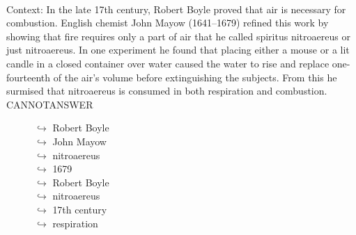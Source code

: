 \documentclass[11pt,a4paper, onecolumn]{article}
\begin{document}
\\ Context: In the late 17th century, Robert Boyle proved that air is necessary for combustion. English chemist John Mayow (1641–1679) refined this work by showing that fire requires only a part of air that he called spiritus nitroaereus or just nitroaereus. In one experiment he found that placing either a mouse or a lit candle in a closed container over water caused the water to rise and replace one-fourteenth of the air's volume before extinguishing the subjects. From this he surmised that nitroaereus is consumed in both respiration and combustion. CANNOTANSWER

\begin{figure}[t] \small \begin{tcolorbox}[boxsep=0pt,left=5pt,right=0pt,top=2pt,colback = yellow!5] \begin{dialogue}
 \small 
\colorbox{pink!25}{$\hookrightarrow$}
{ Robert Boyle }
\\
\colorbox{pink!25}{$\hookrightarrow$}
{ John Mayow }
\\
\colorbox{pink!25}{$\hookrightarrow$}
{ nitroaereus }
\\
\colorbox{pink!25}{$\hookrightarrow$}
{ 1679 }
\\
\colorbox{pink!25}{$\hookrightarrow$}
{ Robert Boyle }
\\
\colorbox{pink!25}{$\hookrightarrow$}
{ nitroaereus }
\\
\colorbox{pink!25}{$\hookrightarrow$}
{ 17th century }
\\
\colorbox{pink!25}{$\hookrightarrow$}
{ respiration }
 \end{dialogue}\end{tcolorbox}\end{figure}\begin{figure}[t] \small \begin{tcolorbox}[boxsep=0pt,left=5pt,right=0pt,top=2pt,colback = yellow!5] \begin{dialogue}

\end{dialogue}
\end{tcolorbox}
\end{figure}
\end{document}
